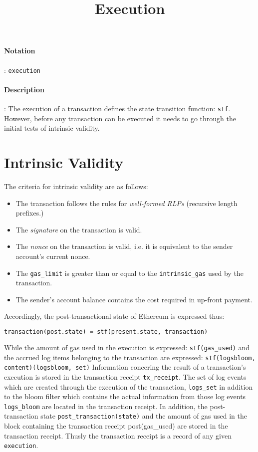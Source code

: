 \documentclass[10pt,a4paper,oneside]{scrartcl}
\author{}
\title{Execution}
\date{}
\begin{document}
\maketitle
\paragraph{Notation}: \texttt{execution}
\paragraph{Description}: The execution of a transaction defines the state transition function: \texttt{stf}. However, before any transaction can be executed it needs to go through the initial tests of intrinsic validity. 

\section{Intrinsic Validity}

The criteria for intrinsic validity are as follows:

	\begin{itemize}
		\item The transaction follows the rules for \textsl{well-formed RLPs} (recursive length prefixes.)
		\item The \textsl{signature} on the transaction is valid.
		\item The \textsl{nonce} on the transaction is valid, i.e. it is equivalent to the sender account's current nonce.
		\item The \texttt{gas\_limit} is greater than or equal to the \texttt{intrinsic\_gas} used by the transaction.
		\item The sender's account balance contains the cost required in up-front payment.
	\end{itemize}

Accordingly, the post-transactional state of Ethereum is expressed thus: 

	\begin{lstlisting}[language=python]
transaction(post.state) = stf(present.state, transaction)  
	\end{lstlisting}
While the amount of gas used in the execution is expressed: \texttt{stf(gas\_used)} and the accrued log items belonging to the transaction are expressed: \texttt{stf(logsbloom, content)(logsbloom, set)}
Information concering the result of a transaction's execution is stored in the transaction receipt \texttt{tx\_receipt}. The set of log events which are created through the execution of the transaction, \texttt{logs\_set} in addition to the bloom filter which contains the actual information from those log events \texttt{logs\_bloom} are located in the transaction receipt. In addition, the post-transaction state \texttt{post\_transaction(state)} and the amount of gas used in the block containing the transaction receipt post(gas\_used) are stored in the transaction receipt. Thusly the transaction receipt is a record of any given \texttt{execution}. \par
\end{document}
